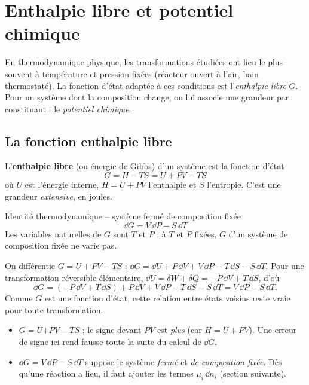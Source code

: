 \chapter{Enthalpie libre et potentiel chimique}
\label{ch:potentiel}

En thermodynamique physique, les transformations étudiées ont lieu le plus souvent à température et pression fixées (réacteur ouvert à l'air, bain thermostaté). La fonction d'état adaptée à ces conditions est l'\emph{enthalpie libre} $G$. Pour un système dont la composition change, on lui associe une grandeur par constituant : le \emph{potentiel chimique}.

\section{La fonction enthalpie libre}

\begin{definition}
L'\textbf{enthalpie libre} (ou énergie de Gibbs) d'un système est la fonction d'état
\[ G = H - TS = U + PV - TS \]
où $U$ est l'énergie interne, $H = U + PV$ l'enthalpie et $S$ l'entropie. C'est une grandeur \emph{extensive}, en joules.
\end{definition}

\begin{resultat}{Identité thermodynamique -- système fermé de composition fixée}
\[ \dd G = V\,\dd P - S\,\dd T \]
Les variables naturelles de $G$ sont $T$ et $P$ : à $T$ et $P$ fixées, $G$ d'un système de composition fixée ne varie pas.
\end{resultat}

\begin{demo}
On différentie $G = U + PV - TS$ : $\dd G = \dd U + P\,\dd V + V\,\dd P - T\,\dd S - S\,\dd T$. Pour une transformation réversible élémentaire, $\dd U = \delta W + \delta Q = -P\,\dd V + T\,\dd S$, d'où
\[ \dd G = (-P\,\dd V + T\,\dd S) + P\,\dd V + V\,\dd P - T\,\dd S - S\,\dd T = V\,\dd P - S\,\dd T. \]
Comme $G$ est une fonction d'état, cette relation entre états voisins reste vraie pour toute transformation.
\end{demo}

\begin{pieges}
\begin{itemize}
  \item $G = U \mathbf{+} PV - TS$ : le signe devant $PV$ est \emph{plus} (car $H = U + PV$). Une erreur de signe ici rend fausse toute la suite du calcul de $\dd G$.
  \item $\dd G = V\,\dd P - S\,\dd T$ suppose le système \emph{fermé} et \emph{de composition fixée}. Dès qu'une réaction a lieu, il faut ajouter les termes $\mu_i\,\dd n_i$ (section suivante).
\end{itemize}
\end{pieges}

